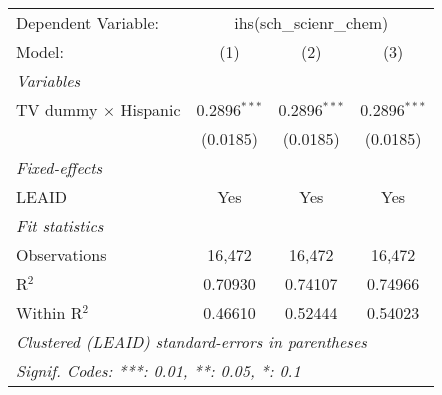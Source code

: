 \begin{tabular}{lccc}
\tabularnewline\midrule\midrule
Dependent Variable:&\multicolumn{3}{c}{ihs(sch\_scienr\_chem)}\\
Model:&(1) & (2) & (3)\\
\midrule \emph{Variables}&   &   &  \\
TV dummy $\times$ Hispanic & 0.2896$^{***}$ & 0.2896$^{***}$ & 0.2896$^{***}$\\
  &(0.0185) & (0.0185) & (0.0185)\\
\midrule \emph{Fixed-effects}&   &   &  \\
LEAID & Yes & Yes & Yes\\
\midrule \emph{Fit statistics}&  & & \\
Observations & 16,472&16,472&16,472\\
R$^2$ & 0.70930&0.74107&0.74966\\
Within R$^2$ & 0.46610&0.52444&0.54023\\
\midrule\midrule\multicolumn{4}{l}{\emph{Clustered (LEAID) standard-errors in parentheses}}\\
\multicolumn{4}{l}{\emph{Signif. Codes: ***: 0.01, **: 0.05, *: 0.1}}\\
\end{tabular}


